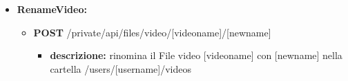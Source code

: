 {{\begin{itemize}
\begin{itemize}
\begin{itemize}
				\end{itemize}
			\item   \textbf{DELETE} /private/api/files/video/[videoname]
				\begin{itemize} 
				\item \textbf{descrizione:} elimina il File video [videoname] dalla cartella /users/[username]/videos			

				\end{itemize}
			\end{itemize}
			
		\item \textbf{RenameVideo:}
			\begin{itemize}
			\item   \textbf{POST} /private/api/files/video/[videoname]/[newname] 
				\begin{itemize} 
				\item \textbf{descrizione:} rinomina il File video [videoname] con [newname] nella cartella /users/[username]/videos

				\end{itemize}
			\end{itemize}

			
	\end{itemize}
		
	}
	
}